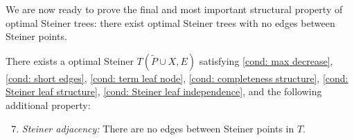 \documentclass{theoretics}
\newcommand{\1}{\textbf{1}}
\renewcommand{\tilde}{\widetilde}
\begin{document}
We are now ready to prove the final and most important structural property of optimal Steiner trees: there exist optimal Steiner trees with no edges between Steiner points. 
\begin{lemma} 
There exists a optimal Steiner  $T(\tilde{P} \cup X, E)$ satisfying \ref{cond: max decrease}, \ref{cond: short edges}, \ref{cond: term leaf node}, \ref{cond: completeness structure}, \ref{cond: Steiner leaf structure}, \ref{cond: Steiner leaf independence}, and the following additional property:
\begin{enumerate}[label=(P\arabic*)]
\setcounter{enumi}{6}
    \item \textit{Steiner adjacency:} There are no edges between Steiner points in $T.$ \label{cond: no Steiner edges}
\end{enumerate}
\end{lemma}
\end{document}
